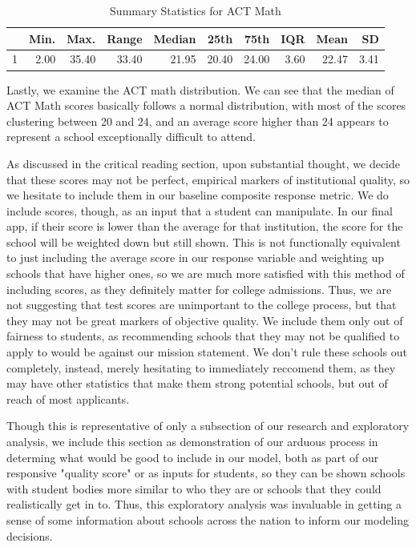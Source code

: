 \documentclass{article}\usepackage[]{graphicx}\usepackage[]{color}
\begin{document}
\begin{table}[ht]
\centering
\begin{tabular}{rrrrrrrrrr}
  \hline
 & Min. & Max. & Range & Median & 25th & 75th & IQR & Mean & SD \\ 
  \hline
1 & 2.00 & 35.40 & 33.40 & 21.95 & 20.40 & 24.00 & 3.60 & 22.47 & 3.41 \\ 
   \hline
\end{tabular}
\caption{Summary Statistics for ACT Math} 
\end{table}



Lastly, we examine the ACT math distribution. We can see that the median of ACT Math scores basically follows a normal distribution, with most of the scores clustering between 20 and 24, and an average score higher than 24 appears to represent a school exceptionally difficult to attend.\newline

As discussed in the critical reading section, upon substantial thought, we decide that these scores may not be perfect, empirical markers of institutional quality, so we hesitate to include them in our baseline composite response metric. We do include scores, though, as an input that a student can manipulate. In our final app, if their score is lower than the average for that institution, the score for the school will be weighted down but still shown. This is not functionally equivalent to just including the average score in our response variable and weighting up schools that have higher ones, so we are much more satisfied with this method of including scores, as they definitely matter for college admissions. Thus, we are not suggesting that test scores are unimportant to the college process, but that they may not be great markers of objective quality. We include them only out of fairness to students, as recommending schools that they may not be qualified to apply to would be against our mission statement. We don't rule these schools out completely, instead, merely hesitating to immediately reccomend them, as they may have other statistics that make them strong potential schools, but out of reach of most applicants.\newline

Though this is representative of only a subsection of our research and exploratory analysis, we include this section as demonstration of our arduous process in determing what would be good to include in our model, both as part of our responsive "quality score" or as inputs for students, so they can be shown schools with student bodies more similar to who they are or schools that they could realistically get in to. Thus, this exploratory analysis was invaluable in getting a sense of some information about schools across the nation to inform our modeling decisions. \newline
\end{document}

